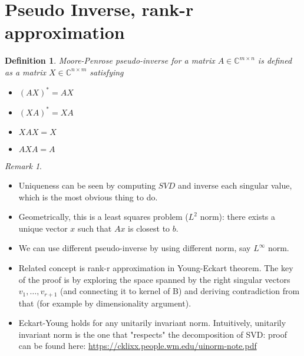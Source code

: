 \documentclass[11pt,reqno]{amsart}
\newtheorem{definition}{Definition}
\theoremstyle{remark}
\newtheorem{remark}[example]{Remark}
\begin{document}
\section{Pseudo Inverse, rank-r approximation}
\begin{definition}
Moore-Penrose pseudo-inverse for a matrix $A\in \mathbb{C}^{m\times n}$ is defined as a matrix $X\in\mathbb{C}^{n\times m}$ satisfying
\begin{itemize}
\item $(AX)^*=AX$
\item $(XA)^* = XA$
\item $XAX=X$
\item $AXA=A$
\end{itemize}
\end{definition}
\begin{remark}
\begin{itemize}
\item Uniqueness can be seen by computing $SVD$ and inverse each singular value, which is the most obvious thing to do.
\item Geometrically, this is a least squares problem ($L^2$ norm): there exists a unique vector $x$ such that $Ax$ is closest to $b$.
\item We can use different pseudo-inverse by using different norm, say $L^\infty$ norm.
\item Related concept is rank-r approximation in Young-Eckart theorem. The key of the proof is by exploring the space spanned by the right
 singular vectors $v_1,\dots,v_{r+1}$ (and connecting it to kernel of B) and deriving contradiction from that (for example by dimensionality argument).
\item Eckart-Young holds for any unitarily invariant norm. Intuitively, unitarily invariant norm is the one that "respects" the decomposition of SVD: proof can be found here: \url{https://cklixx.people.wm.edu/uinorm-note.pdf}
\end{itemize}
\end{remark}
\end{document}

